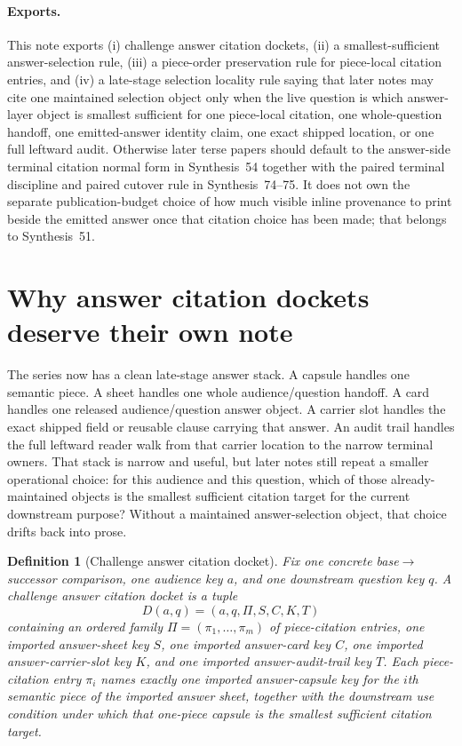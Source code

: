 \documentclass[11pt]{article}
\newtheorem{definition}{Definition}
\begin{document}
\paragraph{Exports.}
This note exports (i) challenge answer citation dockets, (ii) a smallest-sufficient answer-selection rule, (iii) a piece-order preservation rule for piece-local citation entries, and (iv) a late-stage selection locality rule saying that later notes may cite one maintained selection object only when the live question is which answer-layer object is smallest sufficient for one piece-local citation, one whole-question handoff, one emitted-answer identity claim, one exact shipped location, or one full leftward audit. Otherwise later terse papers should default to the answer-side terminal citation normal form in Synthesis~54 together with the paired terminal discipline and paired cutover rule in Synthesis~74--75. It does not own the separate publication-budget choice of how much visible inline provenance to print beside the emitted answer once that citation choice has been made; that belongs to Synthesis~51.\cite{series:challengeanswerpublicationprofiles,series:challengeanswerreviewmenus,series:pairedterminalcitationdiscipline,series:pairedterminalcutoverrules}

\section{Why answer citation dockets deserve their own note}
The series now has a clean late-stage answer stack.
A capsule handles one semantic piece.
A sheet handles one whole audience/question handoff.
A card handles one released audience/question answer object.
A carrier slot handles the exact shipped field or reusable clause carrying that answer.
An audit trail handles the full leftward reader walk from that carrier location to the narrow terminal owners.
That stack is narrow and useful, but later notes still repeat a smaller operational choice: for this audience and this question, which of those already-maintained objects is the smallest sufficient citation target for the current downstream purpose?
Without a maintained answer-selection object, that choice drifts back into prose.

\begin{definition}[Challenge answer citation docket]
Fix one concrete base$\to$successor comparison, one audience key $a$, and one downstream question key $q$.
A \emph{challenge answer citation docket} is a tuple
\[
D(a,q)=(a,q,\Pi,S,C,K,T)
\]
containing an ordered family $\Pi=(\pi_1,\dots,\pi_m)$ of piece-citation entries, one imported answer-sheet key $S$, one imported answer-card key $C$, one imported answer-carrier-slot key $K$, and one imported answer-audit-trail key $T$.
Each piece-citation entry $\pi_i$ names exactly one imported answer-capsule key for the $i$th semantic piece of the imported answer sheet, together with the downstream use condition under which that one-piece capsule is the smallest sufficient citation target.
\end{definition}
\end{document}

